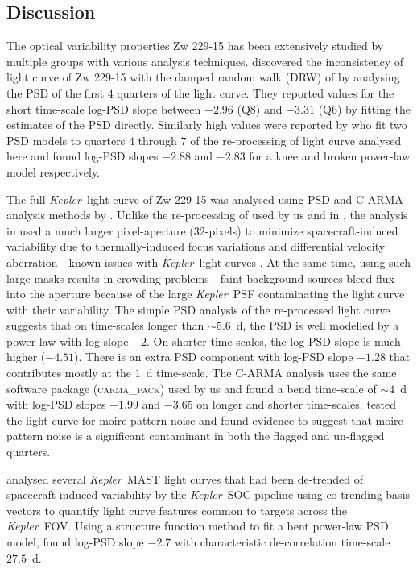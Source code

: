 \documentclass[a4paper,fleqn,usenatbib]{mnras}
\newcommand{\Kepler}{\textit{Kepler~}}
\begin{document}
\subsection[Discussion]{Discussion}\label{sec:Compare}

The optical variability properties Zw 229-15 has been extensively studied by multiple groups with various analysis techniques. \citet{Mushotzky11} discovered the inconsistency of light curve of Zw 229-15 with the damped random walk (DRW) of \citet{Kelly09} by analysing the PSD of the first $4$ quarters of the light curve. They reported values for the short time-scale log-PSD slope between $-2.96$ (Q$8$) and $-3.31$ (Q$6$) by fitting the estimates of the PSD directly. Similarly high values were reported by \citet{Carini12} who fit two PSD models to quarters $4$ through $7$ of the re-processing of light curve analysed here and found log-PSD slopes $-2.88$ and $-2.83$ for a knee and broken power-law model respectively.

The full \Kepler light curve of Zw 229-15 was analysed using PSD and C-ARMA analysis methods by \citet{Edelson14}. Unlike the re-processing of \citet{CariniWilliamsAAS} used by us and in \citet{Kasliwal15b}, the analysis in \citet{Edelson14} used a much larger pixel-aperture ($32$-pixels) to minimize spacecraft-induced variability due to thermally-induced focus variations and differential velocity aberration---known issues with \Kepler light curves \citep{Kinemuchi12}. At the same time, using such large masks results in crowding problems---faint background sources bleed flux into the aperture because of the large \Kepler PSF contaminating the light curve with their variability. The simple PSD analysis of the re-processed light curve suggests that on time-scales longer than $\sim 5.6$~d, the PSD is well modelled by a power law with log-slope $-2$. On shorter time-scales, the log-PSD slope is much higher ($-4.51$). There is an extra PSD component with log-PSD slope $-1.28$ that contributes mostly at the $1$~d time-scale. The C-ARMA analysis uses the same software package (\textsc{carma\_pack}) used by us and found a bend time-scale of $\sim 4$~d with log-PSD slopes $-1.99$ and $-3.65$ on longer and shorter time-scales. \citet{Edelson14} tested the light curve for moire pattern noise and found evidence to suggest that moire pattern noise is a significant contaminant in both the flagged and un-flagged quarters.

\citet{Kasliwal15} analysed several \Kepler MAST light curves that had been de-trended of spacecraft-induced variability by the \Kepler SOC pipeline using co-trending basis vectors to quantify light curve features common to targets across the \Kepler FOV. Using a structure function method to fit a bent power-law PSD model, \citet{Kasliwal15} found log-PSD slope $-2.7$ with characteristic de-correlation time-scale $27.5$~d.
\end{document}
